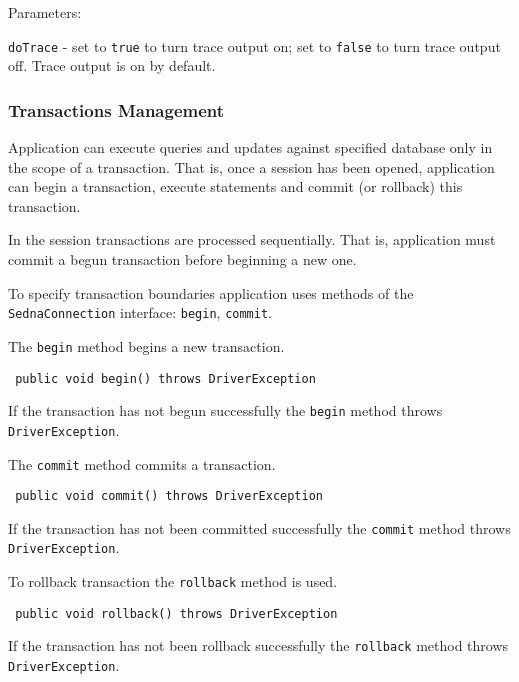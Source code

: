 \documentclass[a4paper,12pt]{article}
\begin{document}
Parameters:

\verb!doTrace! - set to \verb!true! to turn trace output on; set to \verb!false!
to turn trace output off. Trace output is on by default.


\subsubsection{Transactions Management}
Application can execute queries and updates against specified database only in
the scope of a transaction. That is, once a session has been opened, application
can begin a transaction, execute statements and commit (or rollback) this
transaction.

In the session transactions are processed sequentially. That is, application
must commit a begun transaction before beginning a new one.

To specify transaction boundaries application uses methods of the
\verb!SednaConnection! interface: \verb!begin!, \verb!commit!.

The \verb!begin! method begins a new transaction.

\begin{verbatim}
 public void begin() throws DriverException
\end{verbatim}

If the transaction has not begun successfully the \verb!begin! method throws
\verb!DriverException!.

The \verb!commit! method commits a transaction.

\begin{verbatim}
 public void commit() throws DriverException
\end{verbatim}

If the transaction has not been committed successfully the \verb!commit! method
throws \verb!DriverException!.

To rollback transaction the \verb!rollback! method is used.

\begin{verbatim}
 public void rollback() throws DriverException
\end{verbatim}

If the transaction has not been rollback successfully the \verb!rollback! method
throws \verb!DriverException!.
\end{document}

